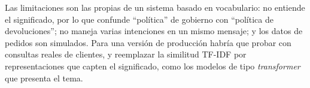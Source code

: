 \documentclass[11pt,letterpaper]{article}
\begin{document}
Las limitaciones son las propias de un sistema basado en vocabulario: no entiende el significado, por lo que confunde ``política'' de gobierno con ``política de devoluciones''; no maneja varias intenciones en un mismo mensaje; y los datos de pedidos son simulados. Para una versión de producción habría que probar con consultas reales de clientes, y reemplazar la similitud TF-IDF por representaciones que capten el significado, como los modelos de tipo \textit{transformer} que presenta el tema.

\end{document}
